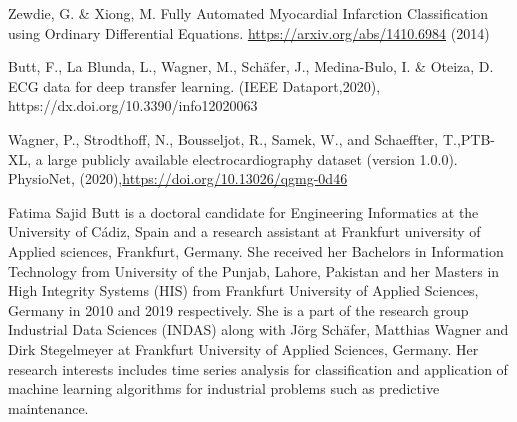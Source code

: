 \documentclass{ieeeaccess}
\begin{document}
\begin{thebibliography}{1}
Zewdie, G. \& Xiong, M. Fully Automated Myocardial Infarction Classification using Ordinary Differential Equations. \url{https://arxiv.org/abs/1410.6984} (2014)















Butt, F., La Blunda, L., Wagner, M., Schäfer, J., Medina-Bulo, I. \& Oteiza, D. ECG data for deep transfer learning. (IEEE Dataport,2020), https://dx.doi.org/10.3390/info12020063

Wagner, P., Strodthoff, N., Bousseljot, R., Samek, W., and Schaeffter, T.,PTB-XL, a large publicly available electrocardiography dataset (version 1.0.0). PhysioNet, (2020),\url{https://doi.org/10.13026/qgmg-0d46}



\end{thebibliography}

\begin{IEEEbiography}
{Fatima Sajid Butt} is a doctoral candidate for Engineering Informatics at the University of Cádiz, Spain and a research assistant at Frankfurt university of Applied sciences, Frankfurt, Germany. She received her Bachelors in Information Technology from University of the Punjab, Lahore, Pakistan and her Masters in High Integrity Systems (HIS) from Frankfurt University of Applied Sciences, Germany in 2010 and 2019 respectively. 
She is a part of the research group Industrial Data Sciences (INDAS) along with Jörg Schäfer, Matthias Wagner and Dirk Stegelmeyer at Frankfurt University of Applied Sciences, Germany. Her research interests includes time series analysis for classification and application of machine learning algorithms for industrial problems such as predictive maintenance. 
\end{IEEEbiography}
\end{document}
